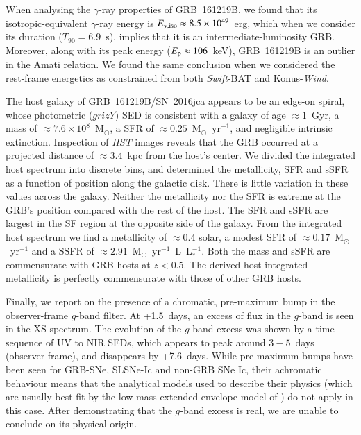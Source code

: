 \documentclass[traditabstract,longauth]{aa}
\begin{document}
When analysing the $\gamma$-ray properties of GRB~161219B, we found that its isotropic-equivalent $\gamma$-ray energy is $E_{\rm \gamma,iso} \approx 8.5\times10^{49}$~erg, which when we consider its duration ($T_{90}=6.9$~s), implies that it is an intermediate-luminosity GRB.  Moreover, along with its peak energy ($E_{\rm p} \approx 106$~keV), GRB~161219B is an outlier in the Amati relation.  We found the same conclusion when we considered the rest-frame energetics as constrained from both \emph{Swift}-BAT and Konus-\emph{Wind}.

The host galaxy of GRB~161219B/SN~2016jca appears to be an edge-on spiral, whose photometric ($grizY$) SED is consistent with a galaxy of age $\approx 1$~Gyr, a mass of $\approx 7.6 \times 10^8$~M$_{\odot}$, a SFR of $\approx 0.25$~M$_{\odot}$~yr$^{-1}$, and negligible intrinsic extinction.  Inspection of \emph{HST} images reveals that the GRB occurred at a projected distance of $\approx 3.4$~kpc from the host's center.  We divided the integrated host spectrum into discrete bins, and determined the metallicity, SFR and sSFR as a function of position along the galactic disk.  There is little variation in these values across the galaxy.  Neither the metallicity nor the SFR is extreme at the GRB's position compared with the rest of the host.  The SFR and sSFR are largest in the SF region at the opposite side of the galaxy.  From the integrated host spectrum we find a metallicity of $\approx 0.4$ solar, a modest SFR of $\approx 0.17$~M$_{\odot}$~yr$^{-1}$ and a SSFR of $\approx 2.91$~M$_{\odot}$~yr$^{-1}$~L~L$_*^{-1}$.   Both the mass and sSFR are commensurate with GRB hosts at $z<0.5$.  The derived host-integrated metallicity is perfectly commensurate with those of other GRB hosts. 

Finally, we report on the presence of a chromatic, pre-maximum bump in the observer-frame $g$-band filter.  At +1.5~days, an excess of flux in the $g$-band is seen in the XS spectrum.  The evolution of the $g$-band excess was shown by a time-sequence of UV to NIR SEDs, which appears to peak around $3-5$~days (observer-frame), and disappears by +7.6~days. While pre-maximum bumps have been seen for GRB-SNe, SLSNe-Ic and non-GRB SNe Ic, their achromatic behaviour means that the analytical models used to describe their physics (which are usually best-fit by the low-mass extended-envelope model of \citealt{Nakar15}) do not apply in this case.  After demonstrating that the $g$-band excess is real, we are unable to conclude on its physical origin.
\end{document}
